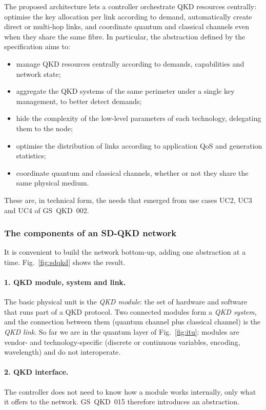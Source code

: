 The proposed architecture lets a controller orchestrate QKD resources
centrally: optimise the key allocation per link according to demand,
automatically create direct or multi-hop links, and coordinate quantum and
classical channels even when they share the same fibre. In particular, the
abstraction defined by the specification aims to:
\begin{itemize}
  \item manage QKD resources centrally according to demands, capabilities
        and network state;
  \item aggregate the QKD systems of the same perimeter under a single key
        management, to better detect demands;
  \item hide the complexity of the low-level parameters of each technology,
        delegating them to the node;
  \item optimise the distribution of links according to application QoS and
        generation statistics;
  \item coordinate quantum and classical channels, whether or not they
        share the same physical medium.
\end{itemize}
These are, in technical form, the needs that emerged from use cases UC2,
UC3 and UC4 of GS~QKD~002.

\subsubsection{The components of an SD-QKD network}

It is convenient to build the network bottom-up, adding one abstraction at
a time. Fig.~\ref{fig:sdqkd} shows the result.

\paragraph{1. QKD module, system and link.}
The basic physical unit is the \emph{QKD module}: the set of hardware and
software that runs part of a QKD protocol. Two connected modules form a
\emph{QKD system}, and the connection between them (quantum channel plus
classical channel) is the \emph{QKD link}. So far we are in the quantum
layer of Fig.~\ref{fig:itu}: modules are vendor- and technology-specific
(discrete or continuous variables, encoding, wavelength) and do not
interoperate.

\paragraph{2. QKD interface.}
The controller does not need to know how a module works internally, only
what it offers to the network. GS~QKD~015 therefore introduces an
abstraction.

